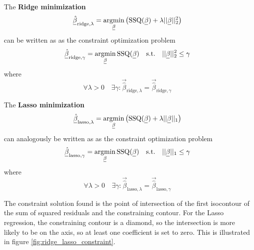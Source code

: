 The \textbf{Ridge minimization}
\begin{equation}
    \vec{\hat{\beta}}_{\text{ridge},\lambda} = \argmin_{\vec{\beta}} \left( \operatorname{SSQ}( \vec{\beta}) + \lambda || \vec{\beta} ||_2^2 \right)
\end{equation}
can be written as as the constraint optimization problem
\begin{equation}
    \vec{\hat{\beta}}_{\text{ridge},\gamma} = \argmin_{\vec{\beta}} \operatorname{SSQ}(\vec{\beta}) \quad \text{s.t.} \quad || \vec{\beta} ||_2^2 \leq \gamma
\end{equation}
where
\begin{equation}
    \forall \lambda > 0 \quad \exists \gamma: \vec{\hat{\beta}}_{\text{ridge},\lambda} = \vec{\hat{\beta}}_{\text{ridge},\gamma}
\end{equation}

The \textbf{Lasso minimization}
\begin{equation}
    \vec{\hat{\beta}}_{\text{lasso},\lambda} = \argmin_{\vec{\beta}} \left( \operatorname{SSQ}( \vec{\beta}) + \lambda || \vec{\beta} ||_1 \right)
\end{equation}
can analogously be written as as the constraint optimization problem
\begin{equation}
    \vec{\hat{\beta}}_{\text{lasso},\gamma} = \argmin_{\vec{\beta}} \operatorname{SSQ}(\vec{\beta}) \quad \text{s.t.} \quad || \vec{\beta} ||_1 \leq \gamma
\end{equation}
where
\begin{equation}
    \forall \lambda > 0 \quad \exists \gamma: \vec{\hat{\beta}}_{\text{lasso},\lambda} = \vec{\hat{\beta}}_{\text{lasso},\gamma}
\end{equation}


The constraint solution found is the point of intersection of the first isocontour of the sum of squared residuals and
the constraining contour. For the Lasso regression, the constraining contour is a diamond, so the intersection
is more likely to be on the axis, so at least one coefficient is set to zero. This is illustrated in figure \ref{fig:ridge_lasso_constraint}.

